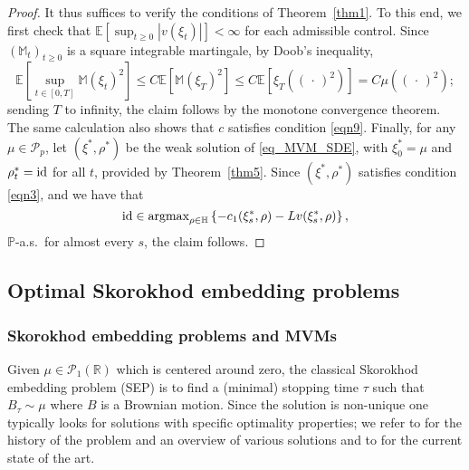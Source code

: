 \documentclass{article}
\theoremstyle{definition}
\numberwithin{equation}{section}
\numberwithin{theorem}{section}
\newcommand{\E}{\mathbb{E}}
\renewcommand{\P}{\mathbb{P}}
\newcommand{\R}{\mathbb{R}}
\newcommand{\Hb}{\mathbb{H}}
\newcommand{\Mb}{\mathbb{M}}
\newcommand{\Pc}{\mathcal{P}}
\newcommand{\Var}{\mathbb{V}\mathrm{ar}}
\renewcommand{\P}{{\mathbb P}}
\newcommand{\Pcal}{{\mathcal P}}
\newcommand{\fdot}{{\,\cdot\,}}
\newcommand{\id}{{\rm id}}
\begin{document}
\begin{proof}
It thus suffices to verify the conditions of Theorem~\ref{thm1}. To this end, we first check that $\E[\sup_{t\geq0}|v(\xi_t)|]<\infty$ for each admissible control. Since $(\Mb_t)_{t\geq 0}$ is a square integrable martingale, by Doob's inequality, $$\E[\sup_{t\in[0,T]}\Mb(\xi_t)^2]\leq C \E[\Mb(\xi_T)^2]\leq C \E[\xi_T((\fdot)^2)]=C\mu((\fdot)^2);$$ 
sending $T$ to infinity, the claim follows by the monotone convergence theorem.
The same calculation also shows that $c$ satisfies condition \eqref{eqn9}. Finally, for any $\mu\in\Pc_p$, let $(\xi^*,\rho^*)$ be the weak solution of \eqref{eq_MVM_SDE}, with $\xi^*_0=\mu$ and $\rho_t^*=\id$ for all $t$, provided by Theorem~\ref{thm5}.  Since $(\xi^*,\rho^*)$ satisfies condition \eqref{eqn3}, and we have that
$$\id\in{\textup{argmax}}_{\rho\in\Hb} \left\{ - c_1(\xi_s^*,\rho) - Lv(\xi_s^*,\rho) \right\},$$
$\P$-a.s.~for almost every $s$, the claim follows.
\end{proof}



	\subsection{Optimal Skorokhod embedding problems} \label{sec:SEP}
	
	\subsubsection*{Skorokhod embedding problems and MVMs}
	
	Given $\mu\in\Pcal_1(\R)$ which is centered around zero, the classical Skorokhod embedding problem (SEP) is to find a (minimal) stopping time $\tau$ such that $B_\tau\sim\mu$ where $B$ is a Brownian motion. Since the solution is non-unique one typically looks for solutions with specific optimality properties; we refer to \cite{obloj2004} for the history of the problem and an overview of various solutions and to \cite{beiglboeck2017} for the current state of the art.
	
\end{document}
